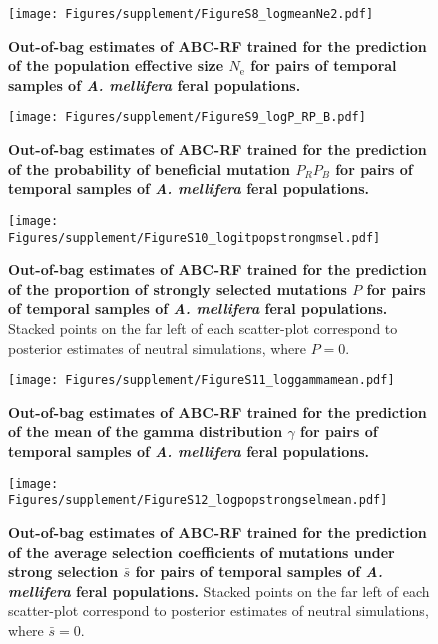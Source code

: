\documentclass[a4paper, 12pt]{article}
\begin{document}
\begin{figure}[ht]
  \centering
  \texttt{[image: Figures/supplement/FigureS8\_logmeanNe2.pdf]}
  \small\caption{\textbf{Out-of-bag estimates of ABC-RF trained for the prediction of the population effective size $N_{\mathrm{e}}$ for pairs of temporal samples of \textit{A. mellifera} feral populations.}}
  \label{fig:supple_feralbee_NE}
\end{figure}

\begin{figure}[ht]
  \centering
  \texttt{[image: Figures/supplement/FigureS9\_logP\_RP\_B.pdf]}
  \small\caption{\textbf{Out-of-bag estimates of ABC-RF trained for the prediction of the probability of beneficial mutation $P_RP_B$ for pairs of temporal samples of \textit{A. mellifera} feral populations.}}
  \label{fig:supple_feralbee_prpb}
\end{figure}

\begin{figure}[ht]
  \centering
  \texttt{[image: Figures/supplement/FigureS10\_logitpopstrongmsel.pdf]}
  \small\caption{\textbf{Out-of-bag estimates of ABC-RF trained for the prediction of the proportion of strongly selected mutations $P$ for pairs of temporal samples of \textit{A. mellifera} feral populations.} Stacked points on the far left of each scatter-plot correspond to posterior estimates of neutral simulations, where $P = 0$.}
  \label{fig:supple_feralbee_pstrong}
\end{figure}

\begin{figure}[ht]
  \centering
  \texttt{[image: Figures/supplement/FigureS11\_loggammamean.pdf]}
  \small\caption{\textbf{Out-of-bag estimates of ABC-RF trained for the prediction of the mean of the gamma distribution $\gamma$ for pairs of temporal samples of \textit{A. mellifera} feral populations.}}
  \label{fig:supple_feralbee_gammamean}
\end{figure}

\begin{figure}[ht]
  \centering
  \texttt{[image: Figures/supplement/FigureS12\_logpopstrongselmean.pdf]}
  \small\caption{\textbf{Out-of-bag estimates of ABC-RF trained for the prediction of the average selection coefficients of mutations under strong selection $\bar{s}$ for pairs of temporal samples of \textit{A. mellifera} feral populations.} Stacked points on the far left of each scatter-plot correspond to posterior estimates of neutral simulations, where $\bar{s} = 0$.}
  \label{fig:supple_feralbee_gammaselmean}
\end{figure}
\end{document}
